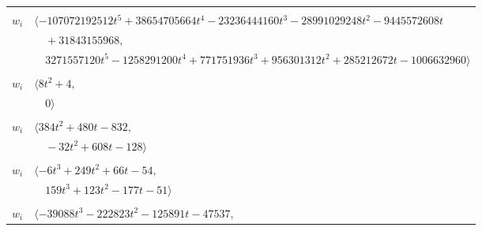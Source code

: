 \documentclass[11pt]{article}
\begin{document}
\begin{longtable}{@{}ll@{}}
\addlinespace[2pt]
\multicolumn{2}{@{}p{0.97\textwidth}@{}}{$i=56$, $D_i=4194304$, $\rho_{ij}$: $3{:}1, \allowbreak 17{:}2, \allowbreak 24{:}1, \allowbreak 36{:}2, \allowbreak 39{:}2, \allowbreak 42{:}2, \allowbreak 43{:}2, \allowbreak 44{:}2, \allowbreak 48{:}2, \allowbreak 54{:}1, \allowbreak 63{:}2, \allowbreak 65{:}1, \allowbreak 68{:}1, \allowbreak 76{:}2$}\\
$w_i$ & $\langle -107072192512t^{5}+38654705664t^{4}-23236444160t^{3}-28991029248t^{2}-9445572608t$\\
 & $\quad +31843155968,$\\
 & $\quad 3271557120t^{5}-1258291200t^{4}+771751936t^{3}+956301312t^{2}+285212672t-1006632960\rangle$\\
\addlinespace[2pt]
\multicolumn{2}{@{}p{0.97\textwidth}@{}}{$i=57$, $D_i=4$, $\rho_{ij}$: $6{:}1, \allowbreak 7{:}1, \allowbreak 11{:}1, \allowbreak 20{:}1, \allowbreak 23{:}1, \allowbreak 26{:}1, \allowbreak 47{:}2, \allowbreak 75{:}1$}\\
$w_i$ & $\langle 8t^{2}+4,$\\
 & $\quad 0\rangle$\\
\addlinespace[2pt]
\multicolumn{2}{@{}p{0.97\textwidth}@{}}{$i=58$, $D_i=32$, $\rho_{ij}$: $4{:}2, \allowbreak 10{:}2, \allowbreak 11{:}1, \allowbreak 14{:}1, \allowbreak 23{:}2, \allowbreak 24{:}1, \allowbreak 25{:}1, \allowbreak 29{:}1, \allowbreak 39{:}1, \allowbreak 42{:}2, \allowbreak 47{:}2$}\\
$w_i$ & $\langle 384t^{2}+480t-832,$\\
 & $\quad -32t^{2}+608t-128\rangle$\\
\addlinespace[2pt]
\multicolumn{2}{@{}p{0.97\textwidth}@{}}{$i=59$, $D_i=4$, $\rho_{ij}$: $3{:}1, \allowbreak 4{:}2, \allowbreak 14{:}2, \allowbreak 25{:}1, \allowbreak 30{:}1, \allowbreak 38{:}2, \allowbreak 44{:}1, \allowbreak 49{:}1, \allowbreak 62{:}1, \allowbreak 76{:}1$}\\
$w_i$ & $\langle -6t^{3}+249t^{2}+66t-54,$\\
 & $\quad 159t^{3}+123t^{2}-177t-51\rangle$\\
\addlinespace[2pt]
\multicolumn{2}{@{}p{0.97\textwidth}@{}}{$i=60$, $D_i=16384$, $\rho_{ij}$: $5{:}1, \allowbreak 8{:}2, \allowbreak 10{:}2, \allowbreak 13{:}2, \allowbreak 15{:}1, \allowbreak 18{:}1, \allowbreak 23{:}2, \allowbreak 36{:}2, \allowbreak 42{:}2, \allowbreak 46{:}2, \allowbreak 53{:}2, \allowbreak 65{:}1$}\\
$w_i$ & $\langle -39088t^{3}-222823t^{2}-125891t-47537,$\\

\end{longtable}
\end{document}

